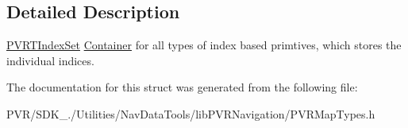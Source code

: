 \subsection{Detailed Description}


  \hyperlink{structpvrnavigation_1_1_p_v_r_t_index_set}{P\+V\+R\+T\+Index\+Set}  \hyperlink{class_container}{Container} for all types of index based primtives, which stores the individual indices. 

The documentation for this struct was generated from the following file\+:\begin{DoxyCompactItemize}
\item 
P\+V\+R/\+S\+D\+K\+\_./\+Utilities/\+Nav\+Data\+Tools/lib\+P\+V\+R\+Navigation/P\+V\+R\+Map\+Types.\+h\end{DoxyCompactItemize}
